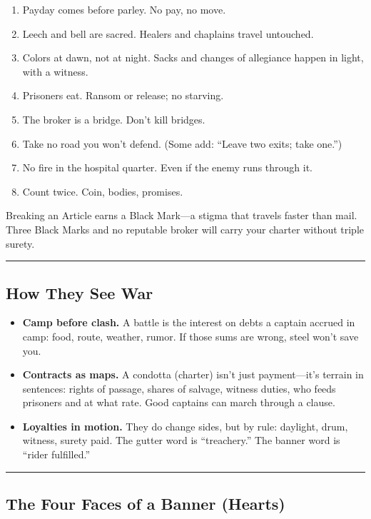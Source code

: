 \documentclass[11pt]{article}
\begin{document}
\begin{enumerate}
    \item Payday comes before parley. No pay, no move.
    \item Leech and bell are sacred. Healers and chaplains travel untouched.
    \item Colors at dawn, not at night. Sacks and changes of allegiance happen in light, with a witness.
    \item Prisoners eat. Ransom or release; no starving.
    \item The broker is a bridge. Don't kill bridges.
    \item Take no road you won't defend. (Some add: ``Leave two exits; take one.'')
    \item No fire in the hospital quarter. Even if the enemy runs through it.
    \item Count twice. Coin, bodies, promises.
\end{enumerate}

Breaking an Article earns a Black Mark---a stigma that travels faster than mail. Three Black Marks and no reputable broker will carry your charter without triple surety.

\rule{\textwidth}{0.4pt}

\subsection*{How They See War}

\begin{itemize}
    \item \textbf{Camp before clash.} A battle is the interest on debts a captain accrued in camp: food, route, weather, rumor. If those sums are wrong, steel won't save you.
    
    \item \textbf{Contracts as maps.} A condotta (charter) isn't just payment---it's terrain in sentences: rights of passage, shares of salvage, witness duties, who feeds prisoners and at what rate. Good captains can march through a clause.
    
    \item \textbf{Loyalties in motion.} They do change sides, but by rule: daylight, drum, witness, surety paid. The gutter word is ``treachery.'' The banner word is ``rider fulfilled.''
\end{itemize}

\rule{\textwidth}{0.4pt}

\subsection*{The Four Faces of a Banner (Hearts)}
\end{document}
